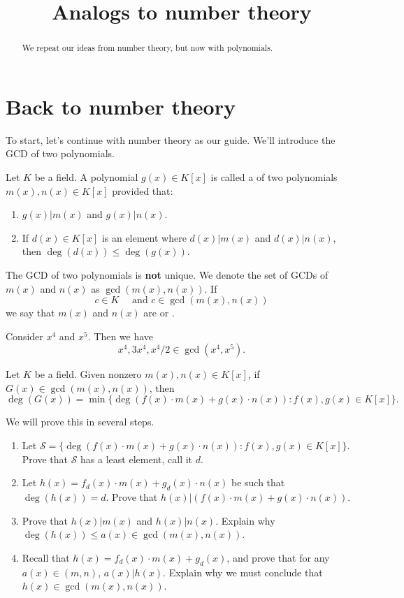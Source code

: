 \documentclass{ximera}
\title{Analogs to number theory}
\begin{document}
\begin{abstract}
  We repeat our ideas from number theory, but now with polynomials.
\end{abstract}
\maketitle


\section{Back to number theory}


To start, let's continue with number theory as our guide. We'll
introduce the GCD of two polynomials.

\begin{definition}
  Let $K$ be a field. A polynomial $g(x)\in K[x]$ is called a
   of two polynomials $m(x),n(x)\in K[x]$
  provided that:
  \begin{enumerate}
  \item $g(x) | m(x)$ and $g(x) | n(x)$.
  \item If $d(x)\in K[x]$ is an element where $d(x)| m(x)$ and $d(x) | n(x)$, then $\deg(d(x))\le \deg(g(x))$.
  \end{enumerate}
  The GCD of two polynomials is \textbf{not} unique.  We denote the set of GCDs
  of $m(x)$ and $n(x)$ as $\gcd(m(x),n(x))$. If
  \[
  c\in K\quad\text{ and }c\in \gcd(m(x),n(x))
  \]
  we say that $m(x)$ and $n(x)$ are  or .
\end{definition}


\begin{example}
  Consider $x^4$ and $x^5$. Then we have
  \[
  x^4, 3x^4, x^4/2 \in \gcd(x^4,x^5).
  \]
\end{example}

\begin{theorem}\label{T:ELP1}
  Let $K$ be a field. Given nonzero $m(x),n(x)\in K[x]$, if $G(x)\in
  \gcd(m(x),n(x))$, then
  \[
  \deg(G(x)) = \min\{\deg(f(x)\cdot m(x) +g(x)\cdot n(x)): f(x),g(x)\in K[x]\}.
  \]
  \begin{sketch} We will prove this in several steps.
  \begin{enumerate}
  \item Let $\mathcal S = \{\deg(f(x)\cdot m(x) +g(x)\cdot n(x)):
    f(x),g(x)\in K[x]\}$. Prove that $\mathcal S$ has a least element,
    call it $d$.
  \item Let $h(x) = f_d(x)\cdot m(x) +g_d(x)\cdot n(x)$ be such that
    $\deg(h(x)) = d$. Prove that $h(x)| (f(x)\cdot m(x) +g(x)\cdot n(x))$.
  \item Prove that $h(x)| m(x)$ and $h(x)| n(x)$. Explain why $\deg(h(x)) \le a(x)\in\gcd(m(x),n(x))$.
  \item Recall that $h(x) = f_d(x)\cdot m(x) +g_d(x)$, and prove that
    for any $a(x)\in(m,n)$, $a(x) | h(x)$. Explain why we must
    conclude that $h(x)\in\gcd(m(x),n(x))$.
  \end{enumerate}
  \end{sketch}
\end{theorem}
\end{document}
